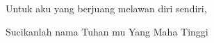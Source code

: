 \documentclass[skripsi]{skripsifasilkom}
\begin{document}
	\begin{persembahan}
		Untuk aku yang berjuang melawan diri sendiri,
	\end{persembahan}
	
	\begin{motto}
		Sucikanlah nama Tuhan mu Yang Maha Tinggi
	\end{motto}

	\begin{abstrak}
		\lipsum[1]	
	\end{abstrak}

	\begin{abstract}
		\lipsum[1]
	\end{abstract}
\end{document}
